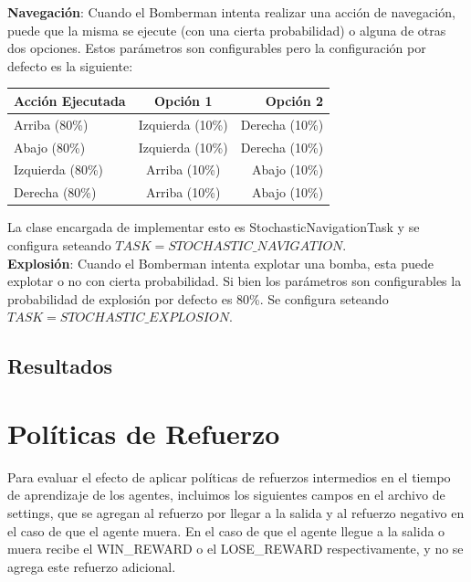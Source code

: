 \documentclass[a4paper,spanish] {article}
\begin{document}
	\textbf{Navegaci\'on}: Cuando el Bomberman intenta realizar una acci\'on de navegaci\'on, puede que la misma se ejecute (con una cierta probabilidad) o alguna de otras dos opciones. Estos par\'ametros son configurables pero la configuraci\'on por defecto es la siguiente:
	
\begin{center}
\begin{tabular}{ l | c | r }
  Acci\'on Ejecutada & Opci\'on 1 & Opci\'on 2 \\
  \hline
  Arriba (80\%) & Izquierda (10\%) & Derecha (10\%) \\
  Abajo (80\%) & Izquierda (10\%) & Derecha (10\%) \\
  Izquierda (80\%) & Arriba (10\%) & Abajo (10\%) \\
  Derecha (80\%) & Arriba (10\%) & Abajo (10\%) \\  
\end{tabular}
\end{center}

	La clase encargada de implementar esto es StochasticNavigationTask y se configura seteando $TASK = STOCHASTIC\_NAVIGATION$.\\
	
		\textbf{Explosi\'on}: Cuando el Bomberman intenta explotar una bomba, esta puede explotar o no con cierta probabilidad. Si bien los par\'ametros son configurables la probabilidad de explosi\'on por defecto es 80\%. Se configura seteando $TASK = STOCHASTIC\_EXPLOSION$.

	\subsection{Resultados}
	
 \section{Pol\'iticas de Refuerzo}
 	Para evaluar el efecto de aplicar pol\'iticas de refuerzos intermedios en el tiempo de aprendizaje de los agentes, incluimos los siguientes campos en el archivo de settings, que se agregan al refuerzo por llegar a la salida y al refuerzo negativo en el caso de que el agente muera. En el caso de que el agente llegue a la salida o muera recibe el WIN\_REWARD o el LOSE\_REWARD respectivamente, y no se agrega este refuerzo adicional.
\end{document}
